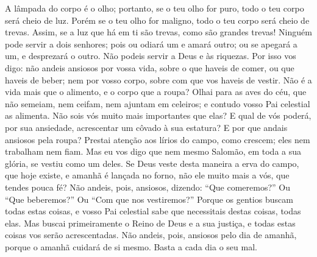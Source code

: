 {  A lâmpada do corpo é o olho; portanto, se o teu olho for puro,
 todo o teu corpo será cheio de luz.
  Porém se o teu olho for maligno, todo o teu corpo será cheio de trevas. Assim, se a luz que há em ti são trevas, como são grandes
{} trevas!
  Ninguém pode servir a dois senhores; pois ou odiará um e amará outro; ou se apegará a um, e desprezará o outro. Não podeis servir a Deus e às riquezas.
  Por isso vos digo: não andeis ansiosos por vossa vida, sobre o que haveis de comer, ou que haveis de beber; nem por vosso corpo, sobre com que vos haveis de vestir. Não é a vida mais que o alimento, e o corpo
{} que a roupa?
  Olhai para as aves do céu, que não semeiam, nem ceifam, nem ajuntam em celeiros; e contudo vosso Pai celestial as alimenta. Não sois vós muito mais importantes que elas?
  E qual de vós poderá, por sua ansiedade, acrescentar um côvado à sua estatura?
  E por que andais ansiosos pela roupa? Prestai atenção aos lírios do campo, como crescem; eles nem trabalham nem fiam.
  Mas eu vos digo que nem mesmo Salomão, em toda a sua glória, se vestiu como um deles.
  Se Deus veste desta maneira a erva do campo, que hoje existe, e amanhã é lançada no forno, não
{} ele muito mais a vós, que tendes pouca fé?
  Não andeis, pois, ansiosos, dizendo: “Que comeremos?” Ou “Que beberemos?” Ou “Com que nos vestiremos?”
  Porque os gentios buscam todas estas coisas, e vosso Pai celestial sabe que necessitais destas coisas, todas elas.
  Mas buscai primeiramente o Reino de Deus e a sua justiça, e todas estas coisas vos serão acrescentadas.
  Não andeis, pois, ansiosos pelo dia de amanhã, porque o amanhã cuidará de si mesmo. Basta a cada dia o seu mal.
\par }

